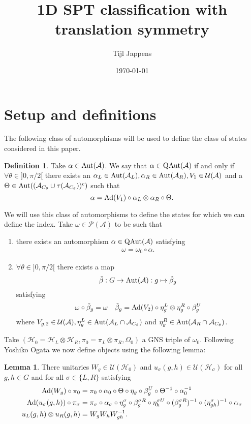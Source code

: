 \documentclass[12pt,a4paper,twoside]{article}
\title{1D SPT classification with translation symmetry}
\author{Tijl Jappens}
\date{\today}
\let\originalleft\left
\let\originalright\right
\renewcommand{\left}{\mathopen{}\mathclose\bgroup\originalleft}
\renewcommand{\right}{\aftergroup\egroup\originalright}
\newcommand{\UU}{\mathcal U}
\newcommand{\PP}{\mathcal P}
\newcommand{\HH}{\mathcal H}
\renewcommand{\AA}{\mathcal A}
\newcommand{\Ad}[1]{\textrm{Ad}\left(#1\right)}
\newcommand{\Aut}[1]{\textrm{Aut}\left(#1\right)}
\newcommand{\QAut}[1]{\textrm{QAut}\left(#1\right)}
\theoremstyle{definition}
\newtheorem{definition}[theorem]{Definition}
\newtheorem{lemma}[theorem]{Lemma}
\numberwithin{equation}{section}
\begin{document}
\section{Setup and definitions}
The following class of automorphisms will be used to define the class of states considered in this paper.
\begin{definition}
	Take $\alpha\in\Aut{\AA}$. We say that $\alpha\in\QAut{\AA}$ if and only if $\forall\theta\in]0,\pi/2[$ there exists an $\alpha_L\in\Aut{\AA_L},\alpha_R\in\Aut{\AA_R},V_1\in\UU(\AA)$ and a $\Theta\in\Aut{(\AA_{C_\theta} \cup \tau(\AA_{C_\theta}))^c}$ such that
	\begin{equation}
	\alpha=\Ad{V_1}\circ\alpha_L\otimes\alpha_R\circ\Theta.
	\end{equation}
\end{definition}
We will use this class of automorphisms to define the states for which we can define the index. Take $\omega\in\PP(\AA)$ to be such that
\begin{enumerate}
	\item  there exists an automorphism $\alpha\in\QAut{\AA}$ satisfying
	\begin{align}
		\omega=\omega_0\circ\alpha.
	\end{align}
	\item $\forall \theta\in]0,\pi/2[$ there exists a map
	\begin{equation}
		\tilde\beta:G\rightarrow\Aut{\AA}:g\mapsto\tilde\beta_g
	\end{equation}
	satisfying
	\begin{align}
		\omega\circ\tilde\beta_g&=\omega&\tilde\beta_g=\Ad{V_2}\circ\eta^L_g\otimes\eta^R_g\circ\beta^U_g
	\end{align}
	where $V_{g,2}\in\UU(\AA),\eta^L_g\in\Aut{\AA_L\cap\AA_{C_\theta}}$ and $\eta^R_g\in\Aut{\AA_R\cap\AA_{C_\theta}}$.
\end{enumerate}
Take $(\HH_0=\HH_L\otimes\HH_R,\pi_0=\pi_L\otimes\pi_R,\Omega_0)$ a GNS triple of $\omega_0$. Following Yoshiko Ogata \cite{ogata2021h3gmathbb} we now define objects using the following lemma:
\begin{lemma}\label{lem:Definition_W_And_u}
	There unitaries $W_g\in\UU(\HH_0)$ and $u_{\sigma}(g,h)\in\UU(\HH_{\sigma})$ for all $g,h\in G$ and for all $\sigma\in\{L,R\}$ satisfying
	\begin{align}
		\Ad{W_g}\circ\pi_0&=\pi_0\circ\alpha_0\circ\Theta\circ\eta_g\circ\beta_g^U\circ\Theta^{-1}\circ\alpha_0^{-1}\\
		\Ad{u_\sigma(g,h)}\circ\pi_\sigma&=\pi_\sigma\circ\alpha_\sigma\circ\eta_g^\sigma\circ\beta_g^{\sigma R}\circ\eta_h^{\sigma U}\circ(\beta_g^{\sigma R})^{-1}\circ(\eta^\sigma_{gh})^{-1}\circ\alpha_\sigma\\
		u_L(g,h)\otimes u_R(g,h)&=W_gW_hW_{gh}^{-1}.
	\end{align}
\end{lemma}
\end{document}
